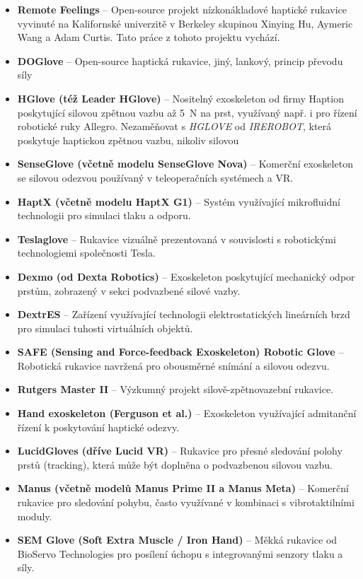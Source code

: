 \begin{itemize}
    \item \textbf{Remote Feelings} – Open-source projekt nízkonákladové haptické rukavice vyvinuté na Kalifornské univerzitě v Berkeley skupinou Xinying Hu, Aymeric Wang a Adam Curtis. Tato práce z tohoto projektu vychází.
    \item \textbf{DOGlove} – Open-source haptická rukavice, jiný, lankový, princip převodu síly
    \item \textbf{HGlove (též Leader HGlove)} – Nositelný exoskeleton od firmy Haption poskytující silovou zpětnou vazbu až 5~N na prst, využívaný např. i pro řízení robotické ruky Allegro. Nezaměňovat s \textit{HGLOVE} od \textit{IREROBOT}, která poskytuje haptickou zpětnou vazbu, nikoliv silovou
    \item \textbf{SenseGlove (včetně modelu SenseGlove Nova)} – Komerční exoskeleton se silovou odezvou používaný v teleoperačních systémech a VR.
    \item \textbf{HaptX (včetně modelu HaptX G1)} – Systém využívající mikrofluidní technologii pro simulaci tlaku a odporu.
    \item \textbf{Teslaglove} – Rukavice vizuálně prezentovaná v souvislosti s robotickými technologiemi společnosti Tesla.
    \item \textbf{Dexmo (od Dexta Robotics)} – Exoskeleton poskytující mechanický odpor prstům, zobrazený v sekci podvazbené silové vazby.
    \item \textbf{DextrES} – Zařízení využívající technologii elektrostatických lineárních brzd pro simulaci tuhosti virtuálních objektů.
    \item \textbf{SAFE (Sensing and Force-feedback Exoskeleton) Robotic Glove} – Robotická rukavice navržená pro obousměrné snímání a silovou odezvu.
    \item \textbf{Rutgers Master II} – Výzkumný projekt silově-zpětnovazební rukavice.
    \item \textbf{Hand exoskeleton (Ferguson et al.)} – Exoskeleton využívající admitanční řízení k poskytování haptické odezvy.
    \item \textbf{LucidGloves (dříve Lucid VR)} – Rukavice pro přesné sledování polohy prstů (tracking), která může být doplněna o podvazbenou silovou vazbu.
    \item \textbf{Manus (včetně modelů Manus Prime II a Manus Meta)} – Komerční rukavice pro sledování pohybu, často využívané v kombinaci s vibrotaktilními moduly.
    \item \textbf{SEM Glove (Soft Extra Muscle / Iron Hand)} – Měkká rukavice od BioServo Technologies pro posílení úchopu s integrovanými senzory tlaku a síly.

\end{itemize}

